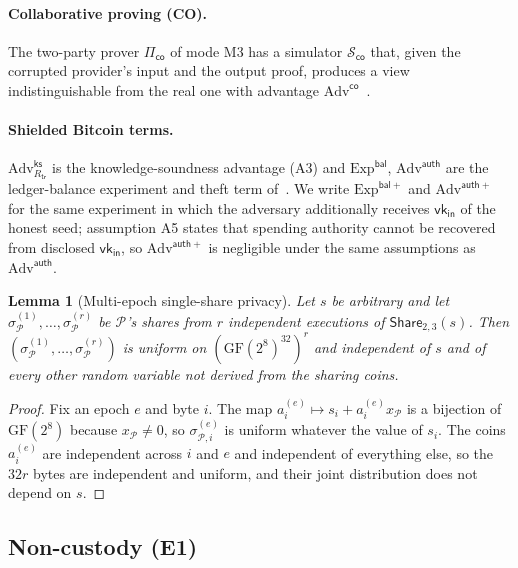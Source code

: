 \documentclass[11pt]{article}
\newtheorem{lemma}{Lemma}
\theoremstyle{remark}
\newcommand{\vk}{\mathsf{vk}}
\newcommand{\SB}{Shielded Bitcoin}
\begin{document}
\paragraph{Collaborative proving (CO).} The two-party prover $\Pi_{\mathsf{co}}$ of mode M3 has a simulator $\mathcal{S}_{\mathsf{co}}$ that, given the corrupted provider's input and the output proof, produces a view indistinguishable from the real one with advantage $\mathrm{Adv}^{\mathsf{co}}$~\cite{ob22}.

\paragraph{\SB{} terms.} $\mathrm{Adv}^{\mathsf{ks}}_{R_{\mathsf{tr}}}$ is the knowledge-soundness advantage (A3) and $\mathrm{Exp}^{\mathsf{bal}}$, $\mathrm{Adv}^{\mathsf{auth}}$ are the ledger-balance experiment and theft term of~\cite[Def.~5, Cor.~2]{sb26}. We write $\mathrm{Exp}^{\mathsf{bal}+}$ and $\mathrm{Adv}^{\mathsf{auth}+}$ for the same experiment in which the adversary additionally receives $\vk_{\mathsf{in}}$ of the honest seed; assumption A5 states that spending authority cannot be recovered from disclosed $\vk_{\mathsf{in}}$, so $\mathrm{Adv}^{\mathsf{auth}+}$ is negligible under the same assumptions as $\mathrm{Adv}^{\mathsf{auth}}$.

\begin{lemma}[Multi-epoch single-share privacy]
\label{lem:shamir}
Let $s$ be arbitrary and let $\sigma_{\mathcal{P}}^{(1)},\dots,\sigma_{\mathcal{P}}^{(r)}$ be $\mathcal{P}$'s shares from $r$ independent executions of $\mathsf{Share}_{2,3}(s)$. Then $(\sigma_{\mathcal{P}}^{(1)},\dots,\sigma_{\mathcal{P}}^{(r)})$ is uniform on $(\mathrm{GF}(2^8)^{32})^r$ and independent of $s$ and of every other random variable not derived from the sharing coins.
\end{lemma}
\begin{proof}
Fix an epoch $e$ and byte $i$. The map $a^{(e)}_i \mapsto s_i + a^{(e)}_i x_{\mathcal{P}}$ is a bijection of $\mathrm{GF}(2^8)$ because $x_{\mathcal{P}} \neq 0$, so $\sigma^{(e)}_{\mathcal{P},i}$ is uniform whatever the value of $s_i$. The coins $a^{(e)}_i$ are independent across $i$ and $e$ and independent of everything else, so the $32r$ bytes are independent and uniform, and their joint distribution does not depend on $s$.
\end{proof}

\subsection{Non-custody (E1)}
\end{document}
